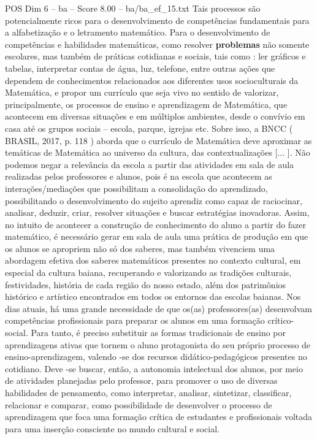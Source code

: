\begin{textsample}{POS Dim 6 – ba – Score 8.00 – ba/ba\_ef\_15.txt}
Tais processos são potencialmente ricos para o desenvolvimento de competências fundamentais para a alfabetização e o letramento matemático.
Para o desenvolvimento de competências e habilidades matemáticas, como resolver \textbf{problemas} não somente escolares, mas também de práticas cotidianas e sociais, tais como : ler gráficos e tabelas, interpretar contas de água, luz, telefone, entre outras ações que dependem de conhecimentos relacionados aos diferentes usos socioculturais da Matemática, e propor um currículo que seja vivo no sentido de valorizar, principalmente, os processos de ensino e aprendizagem de Matemática, que acontecem em diversas situações e em múltiplos ambientes, desde o convívio em casa até os grupos sociais – escola, parque, igrejas etc.
Sobre isso, a BNCC ( BRASIL, 2017, p. 118 ) aborda que o currículo de Matemática deve aproximar as temáticas de Matemática ao universo da cultura, das contextualizações [... ].
Não podemos negar a relevância da escola a partir das atividades em sala de aula realizadas pelos professores e alunos, pois é na escola que acontecem as interações/mediações que possibilitam a consolidação do aprendizado, possibilitando o desenvolvimento do sujeito aprendiz como capaz de raciocinar, analisar, deduzir, criar, resolver situações e buscar estratégias inovadoras.
Assim, no intuito de acontecer a construção de conhecimento do aluno a partir do fazer matemático, é necessário gerar em sala de aula uma prática de produção em que os alunos se apropriem não só dos saberes, mas também vivenciem uma abordagem efetiva dos saberes matemáticos presentes no contexto cultural, em especial da cultura baiana, recuperando e valorizando as tradições culturais, festividades, história de cada região do nosso estado, além dos patrimônios histórico e artístico encontrados em todos os entornos das escolas baianas.
Nos dias atuais, há uma grande necessidade de que os(as) professores(as) desenvolvam competências profissionais para preparar os alunos em uma formação crítico-social.
Para tanto, é preciso substituir as formas tradicionais de ensino por aprendizagens ativas que tornem o aluno protagonista do seu próprio processo de ensino-aprendizagem, valendo -se dos recursos didático-pedagógicos presentes no cotidiano.
Deve -se buscar, então, a autonomia intelectual dos alunos, por meio de atividades planejadas pelo professor, para promover o uso de diversas habilidades de pensamento, como interpretar, analisar, sintetizar, classificar, relacionar e comparar, como possibilidade de desenvolver o processo de aprendizagem que foca uma formação crítica de estudantes e profissionais voltada para uma inserção consciente no mundo cultural e social.

\end{textsample}

